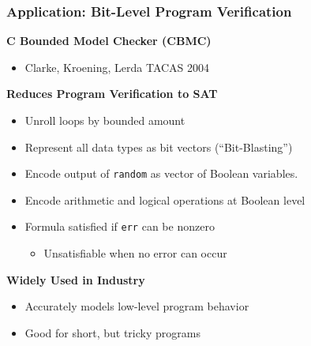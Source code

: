\documentclass[t,pdf]{beamer}
\begin{document}
\begin{frame}
  \frametitle{Application: Bit-Level Program Verification}
      {\bf C Bounded Model Checker (CBMC)}
      \begin{itemize}
      \item Clarke, Kroening, Lerda  TACAS 2004
      \end{itemize}
\medskip
      {\bf Reduces Program Verification to SAT}
      \begin{itemize}
      \item Unroll loops by bounded amount
      \item Represent all data types as bit vectors (``Bit-Blasting'')
      \item Encode output of {\tt random} as vector of Boolean variables.
      \item Encode arithmetic and logical operations at Boolean level
      \item Formula satisfied if {\tt err} can be nonzero
        \begin{itemize}
          \item Unsatisfiable when no error can occur
        \end{itemize}
      \end{itemize}
      \medskip
      {\bf Widely Used in Industry}
      \begin{itemize}
      \item Accurately models low-level program behavior
      \item Good for short, but tricky programs
      \end{itemize}

\end{frame}
\end{document}

